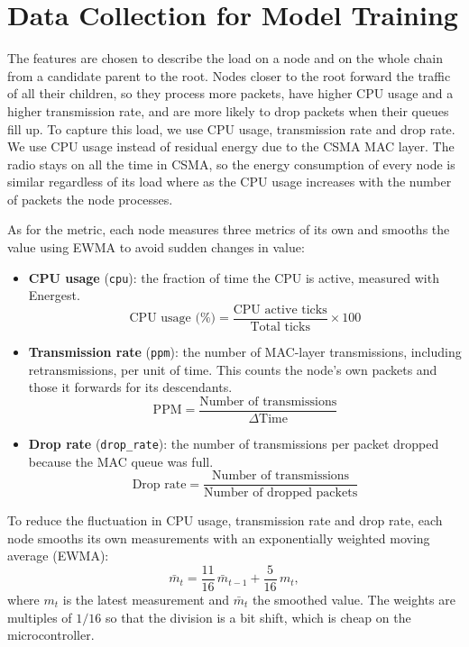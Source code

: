 \section{Data Collection for Model Training}
\label{sec:data-collection}
The features are chosen to describe the load on a node and on the
whole chain from a candidate parent to the root. Nodes closer to the root
forward the traffic of all their children, so they process more
packets, have higher CPU usage and a higher transmission rate, and
are more likely to drop packets when their queues fill up. To capture
this load, we use CPU usage, transmission rate and drop rate. We use
CPU usage instead of residual energy
due to the CSMA MAC layer. The radio stays on all the time in CSMA,
so the energy
consumption of every node is similar regardless of its load where as
the CPU usage increases with the number of packets the node processes.

As for the metric, each node measures three metrics of
its own and smooths the value
using EWMA to avoid sudden changes in value:
\begin{itemize}
    \item \textbf{CPU usage} (\texttt{cpu}): the fraction of time the
        CPU is active, measured with Energest.
        \begin{equation}
            \text{CPU usage (\%)} = \frac{\text{CPU active ticks}}{\text{Total
            ticks}} \times 100
        \end{equation}
    \item \textbf{Transmission rate} (\texttt{ppm}): the number of
        MAC-layer transmissions, including retransmissions, per unit
        of time. This counts the node's own packets and those it
        forwards for its descendants.
        \begin{equation}
            \text{PPM} = \frac{\text{Number of transmissions}}{\Delta
            \text{Time}}
        \end{equation}
    \item \textbf{Drop rate} (\texttt{drop\_rate}): the number of
        transmissions per packet dropped because the MAC queue was
        full.
        \begin{equation}
            \text{Drop rate} = \frac{\text{Number of
            transmissions}}{\text{Number of dropped packets}}
        \end{equation}
\end{itemize}

To reduce the fluctuation in CPU usage, transmission rate and drop
rate, each node smooths its own measurements with an
exponentially weighted moving average (EWMA):
\begin{equation}
    \bar{m}_t = \frac{11}{16}\,\bar{m}_{t-1} + \frac{5}{16}\,m_t,
\end{equation}
where $m_t$ is the latest measurement and $\bar{m}_t$ the smoothed
value. The weights are multiples of $1/16$ so that the division is a
bit shift, which is cheap on the microcontroller.


